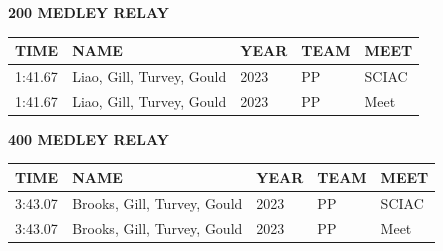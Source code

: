 \begin{table}[H]
\centering
\begin{minipage}[t]{0.6\textwidth}
\centering
\textbf{200 MEDLEY RELAY}\\[0.1cm]
\begin{tabular}{@{}p{1.8cm}p{2.8cm}p{1.2cm}p{1.4cm}p{1.4cm}@{}}
\hline
    \textbf{TIME} & \textbf{NAME} & \textbf{YEAR} & \textbf{TEAM} & \textbf{MEET} \\
\hline
    1:41.67 & Liao, Gill, Turvey, Gould & 2023 & PP & SCIAC \\
    1:41.67 & Liao, Gill, Turvey, Gould & 2023 & PP & Meet \\
\hline
\end{tabular}
\end{minipage}
\end{table}

\begin{table}[H]
\centering
\begin{minipage}[t]{0.6\textwidth}
\centering
\textbf{400 MEDLEY RELAY}\\[0.1cm]
\begin{tabular}{@{}p{1.8cm}p{2.8cm}p{1.2cm}p{1.4cm}p{1.4cm}@{}}
\hline
    \textbf{TIME} & \textbf{NAME} & \textbf{YEAR} & \textbf{TEAM} & \textbf{MEET} \\
\hline
    3:43.07 & Brooks, Gill, Turvey, Gould & 2023 & PP & SCIAC \\
    3:43.07 & Brooks, Gill, Turvey, Gould & 2023 & PP & Meet \\
\hline
\end{tabular}
\end{minipage}
\end{table}


\newpage



